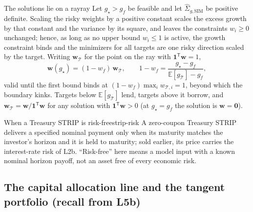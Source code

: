 \documentclass[11pt]{article}
\newcommand{\E}{\mathbb{E}}
\newcommand{\bw}{\mathbf w}
\newcommand{\Tan}{\mathcal T}
\newcommand{\SigSIM}{\hat\Sigma_{g,\mathrm{SIM}}}
\begin{document}
\begin{proposition}{The solutions lie on a ray}{ray}
Let $g_\star>g_f$ be feasible and let $\SigSIM$ be positive definite. Scaling the risky weights by a positive constant scales the excess growth by that constant and the variance by its square, and leaves the constraints $w_i\ge0$ unchanged; hence, as long as no upper bound $w_i\le1$ is active, the growth constraint binds and the minimizers for all targets are one risky direction scaled by the target. Writing $\bw_{\Tan}$ for the point on the ray with $\mathbf 1^{\mathsf T}\bw=1$,
\begin{equation}
  \label{eq:ray}
  \bw(g_\star)=(1-w_f)\,\bw_{\Tan},
  \qquad
  1-w_f=\frac{g_\star-g_f}{\E[g_{\Tan}]-g_f},
\end{equation}
valid until the first bound binds at $(1-w_f)\max_i w_{\Tan,i}=1$, beyond which the boundary kinks. Targets below $\E[g_{\Tan}]$ lend, targets above it borrow, and $\bw_{\Tan}=\bw/\mathbf 1^{\mathsf T}\bw$ for any solution with $\mathbf 1^{\mathsf T}\bw>0$ (at $g_\star=g_f$ the solution is $\bw=\mathbf 0$).
\end{proposition}

\begin{remark}{When a Treasury STRIP is risk-free}{strip-risk}
A zero-coupon Treasury STRIP delivers a specified nominal payment only when its maturity matches the investor's horizon and it is held to maturity; sold earlier, its price carries the interest-rate risk of L2b. ``Risk-free'' here means a model input with a known nominal horizon payoff, not an asset free of every economic risk.
\end{remark}

\subsection*{The capital allocation line and the tangent portfolio (recall from L5b)}
\end{document}
